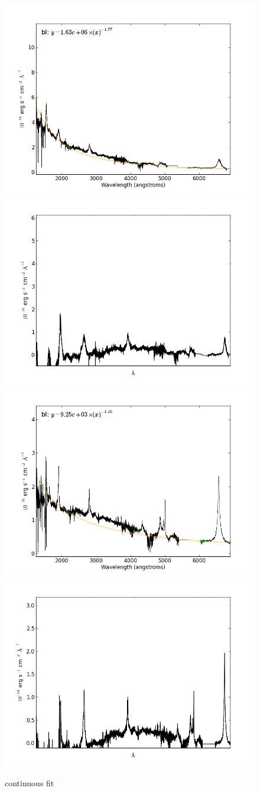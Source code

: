 \documentclass[usenatbib]{mn2e}
\begin{document}
\begin{figure}
\begin{center}

\includegraphics[width=0.46\linewidth,angle=0]{continuous_6.png}
\vspace{5mm}
\includegraphics[width=0.49\linewidth,angle=0]{no_continuous_6.png}\\
\includegraphics[width=0.46\linewidth,angle=0]{continuous_7.png}
\hspace{5mm}
\includegraphics[width=0.49\linewidth,angle=0]{no_continuous_7.png}\\

\end{center} 
\caption{continuous fit \label{fig:landscape}}   
\end{figure}
\end{document}
